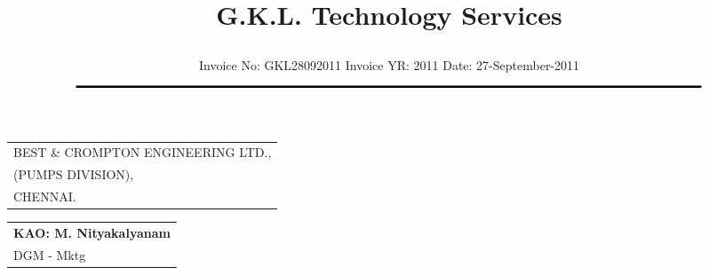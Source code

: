 \documentclass[11pt]{article}
\title{\vspace*{-1.5cm} \centerline{ \Huge \bf \hspace{0cm} G.K.L. Technology Services}\vspace*{-0.75cm}}
\author{%
 \scriptsize Invoice No: GKL28092011  \hspace*{3.25cm}  Invoice YR: 2011 \hspace*{3.25cm} Date: 27-September-2011\\
$\rule{7in}{0.5mm}$}
\date{}
\begin{document}
\maketitle
\thispagestyle{empty}
\vspace*{1cm}	
\begin{flushleft}
{\footnotesize
\begin{tabular}{l}
BEST \& CROMPTON ENGINEERING LTD.,\\
(PUMPS DIVISION),\\
CHENNAI.\\
\end{tabular}
}
\end{flushleft}

\vspace*{-2cm}

\begin{flushright}
\begin{tabular}{l}
\footnotesize \bf KAO: M. Nityakalyanam\\
\footnotesize DGM - Mktg\\
\end{tabular}
\end{flushright}



\vspace{2cm}
\end{document}
